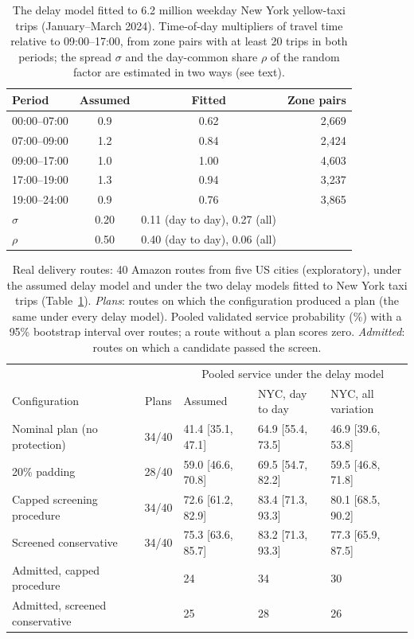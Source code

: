 \documentclass[12pt,letterpaper]{article}
\begin{document}
\begin{table}[t]
\centering
\small
\caption{The delay model fitted to 6.2 million weekday New York yellow-taxi trips (January--March 2024). Time-of-day multipliers of travel time relative to 09:00--17:00, from zone pairs with at least 20 trips in both periods; the spread $\sigma$ and the day-common share $\rho$ of the random factor are estimated in two ways (see text).}
\label{tab:nyc}
\begin{tabular}{@{}lccr@{}}
\toprule
Period & Assumed & Fitted & Zone pairs\\
\midrule
00:00--07:00 & 0.9 & 0.62 & 2{,}669\\
07:00--09:00 & 1.2 & 0.84 & 2{,}424\\
09:00--17:00 & 1.0 & 1.00 & 4{,}603\\
17:00--19:00 & 1.3 & 0.94 & 3{,}237\\
19:00--24:00 & 0.9 & 0.76 & 3{,}865\\
\midrule
$\sigma$ & 0.20 & 0.11 (day to day), 0.27 (all) & \\
$\rho$ & 0.50 & 0.40 (day to day), 0.06 (all) & \\
\bottomrule
\end{tabular}
\end{table}

\begin{table}[t]
\centering
\small
\setlength{\tabcolsep}{4pt}
\caption{Real delivery routes: 40 Amazon routes from five US cities (exploratory), under the assumed delay model and under the two delay models fitted to New York taxi trips (Table~\ref{tab:nyc}). \emph{Plans}: routes on which the configuration produced a plan (the same under every delay model). Pooled validated service probability (\%) with a 95\% bootstrap interval over routes; a route without a plan scores zero. \emph{Admitted}: routes on which a candidate passed the screen.}
\label{tab:amazon}
\begin{tabular}{@{}lclll@{}}
\toprule
 & & \multicolumn{3}{c}{Pooled service under the delay model} \\
Configuration & Plans & Assumed & NYC, day to day & NYC, all variation\\
\midrule
Nominal plan (no protection) & 34/40 & 41.4 [35.1, 47.1] & 64.9 [55.4, 73.5] & 46.9 [39.6, 53.8]\\
20\% padding & 28/40 & 59.0 [46.6, 70.8] & 69.5 [54.7, 82.2] & 59.5 [46.8, 71.8]\\
Capped screening procedure & 34/40 & 72.6 [61.2, 82.9] & 83.4 [71.3, 93.3] & 80.1 [68.5, 90.2]\\
Screened conservative & 34/40 & 75.3 [63.6, 85.7] & 83.2 [71.3, 93.3] & 77.3 [65.9, 87.5]\\
\midrule
Admitted, capped procedure & & 24 & 34 & 30\\
Admitted, screened conservative & & 25 & 28 & 26\\
\bottomrule
\end{tabular}
\end{table}
\end{document}
